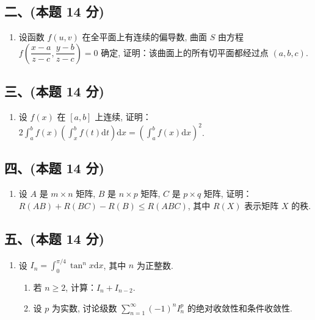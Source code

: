\subsection*{二、(本题 14 分)}
\begin{enumerate}[start=6]
    \item 设函数 $f(u, v)$ 在全平面上有连续的偏导数, 曲面 $S$ 由方程 $f\left(\dfrac{x-a}{z-c}, \dfrac{y-b}{z-c}\right) = 0$ 确定, 证明：该曲面上的所有切平面都经过点 $(a, b, c)$.
\end{enumerate}

\subsection*{三、(本题 14 分)}
\begin{enumerate}[start=7]
    \item 设 $f(x)$ 在 $[a, b]$ 上连续, 证明：$2 \displaystyle\int_{a}^{b} f(x) \left( \int_{x}^{b} f(t) \mathrm{d}t \right) \mathrm{d}x = \left( \int_{a}^{b} f(x) \mathrm{d}x \right)^2$.
\end{enumerate}

\subsection*{四、(本题 14 分)}
\begin{enumerate}[start=8]
    \item 设 $A$ 是 $m \times n$ 矩阵, $B$ 是 $n \times p$ 矩阵, $C$ 是 $p \times q$ 矩阵, 证明：$R(AB) + R(BC) - R(B) \leqslant R(ABC)$, 其中 $R(X)$ 表示矩阵 $X$ 的秩.
\end{enumerate}

\subsection*{五、(本题 14 分)}
\begin{enumerate}[start=9]
    \item 设 $I_n = \displaystyle\int_{0}^{\pi/4} \tan^n x \mathrm{d}x$, 其中 $n$ 为正整数.
          \begin{enumerate}
              \item[(1)] 若 $n \geqslant 2$, 计算：$I_n + I_{n-2}$.
              \item[(2)] 设 $p$ 为实数, 讨论级数 $\displaystyle\sum_{n=1}^{\infty} (-1)^n I_n^p$ 的绝对收敛性和条件收敛性.
          \end{enumerate}
\end{enumerate}

